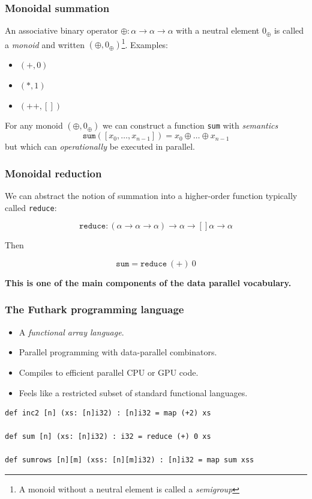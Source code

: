 \begin{frame}
  \frametitle{Monoidal summation}

  An associative binary operator
  $\oplus : \alpha \rightarrow \alpha \rightarrow \alpha$ with a
  neutral element $0_{\oplus}$ is called a \textit{monoid} and written
  $(\oplus, 0_{\oplus})$\footnote{A monoid without a neutral element
    is called a \textit{semigroup}}.  Examples:

  \begin{itemize}
  \item $(+, 0)$
  \item $(*, 1)$
  \item $(++, [])$
  \end{itemize}

  \pause

  For any monoid $(\oplus, 0_{\oplus})$ we can construct a function
  \texttt{sum} with \textit{semantics}
  \[
    \texttt{sum}([x_{0}, \ldots, x_{n-1}]) = x_{0} \oplus \ldots \oplus x_{n-1}
  \]
  but which can \textit{operationally} be executed in parallel.

\end{frame}

\begin{frame}
  \frametitle{Monoidal reduction}

  We can abstract the notion of summation into a higher-order function
  typically called \texttt{reduce}:

  \[
    \texttt{reduce} : (\alpha \rightarrow \alpha \rightarrow \alpha) \rightarrow \alpha \rightarrow []\alpha \rightarrow \alpha
  \]

  Then

  \[
    \texttt{sum} = \texttt{reduce}~(+)~0
  \]

  \pause

  \textbf{This is one of the main components of the data parallel vocabulary.}
\end{frame}

\begin{frame}[fragile]
  \frametitle{The Futhark programming language}


  \begin{itemize}
  \item A \emph{functional array language}.
  \item Parallel programming with data-parallel combinators.
  \item Compiles to efficient parallel CPU or GPU code.
  \item Feels like a restricted subset of standard functional languages.
  \end{itemize}

\begin{lstlisting}
def inc2 [n] (xs: [n]i32) : [n]i32 = map (+2) xs

def sum [n] (xs: [n]i32) : i32 = reduce (+) 0 xs

def sumrows [n][m] (xss: [n][m]i32) : [n]i32 = map sum xss
\end{lstlisting}

\end{frame}

